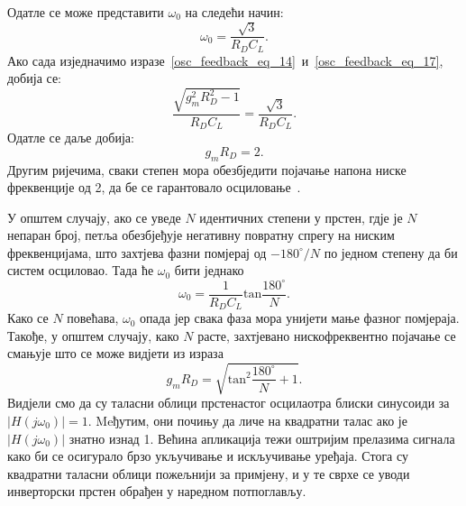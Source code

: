 \documentclass[master]{finthesis}
\begin{document}
Одатле се може представити $\omega_{0}$ на следећи начин:
\begin{equation}
	\label{osc_feedback_eq_17}
	\displaystyle
	\omega_{0} = \frac{\sqrt{3}}{R_{D}C_{L}}.
\end{equation}
Ако сада изједначимо изразе~\ref{osc_feedback_eq_14}~и~\ref{osc_feedback_eq_17}, добија се:
\begin{equation}
	\label{osc_feedback_eq_18}
	\displaystyle
	\frac{\sqrt{g_{m}^{2}R_{D}^{2}-1}}{R_{D}C_{L}} = \frac{\sqrt{3}}{R_{D}C_{L}}.
\end{equation}
Одатле се даље добија:
\begin{equation}
	\label{osc_feedback_eq_19}
	\displaystyle
	g_{m}R_{D} = 2.
\end{equation}
Другим ријечима, сваки степен мора обезбједити појачање напона ниске фреквенције од 2, да бе се гарантовало осциловање~\cite{Razavi:PLL_CMOS_2020}. \par
У општем случају, ако се уведе $N$ идентичних степени у прстен, гдје је $N$ непаран број, петља обезбјеђује негативну повратну спрегу на ниским фреквенцијама, што захтјева фазни помјерај од $-180^{\circ}/N$ по једном степену да би систем осциловао. Тада ће $\omega_{0}$ бити једнако
\begin{equation}
	\label{osc_feedback_eq_20}
	\displaystyle
	\omega_{0} = \frac{1}{R_{D}C_{L}}\text{tan}\frac{180^{\circ}}{N}.
\end{equation}
Како се $N$ повећава, $\omega_{0}$ опада јер свака фаза мора унијети мање фазног помјераја. Такође, у општем случају, како $N$ расте, захтјевано нискофреквентно појачање се смањује што се може видјети из израза
\begin{equation}
	\label{osc_feedback_eq_21}
	\displaystyle
	g_{m}R_{D} = \sqrt{\text{tan}^{2}\frac{180^{\circ}}{N}+1}.
\end{equation}
Видјели смо да су таласни облици прстенастог осцилаотра блиски синусоиди за $|H(j\omega_{0})|=1$. Meђутим, они почињу да личе на квадратни талас ако је $|H(j\omega_{0})|$ знатно изнад 1. Већина апликација тежи оштријим прелазима сигнала како би се осигурало брзо укључивање и искључивање уређаја. Стога су квадратни таласни облици пожељнији за примјену, и у те сврхе се уводи инверторски прстен обрађен у наредном потпоглављу.
\end{document}
